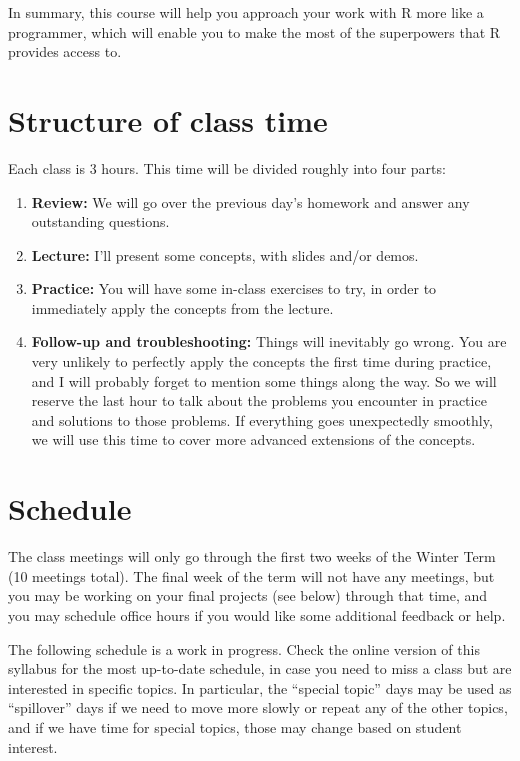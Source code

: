 \documentclass{tufte-handout}
\begin{document}
In summary, this course will help you approach your work with R more like a programmer, which will enable you to make the most of the superpowers that R provides access to.
\section*{Structure of class time}
\label{sec-4}

Each class is 3 hours.  This time will be divided roughly into four parts:
\begin{enumerate}
\item \textbf{Review:} We will go over the previous day's homework and answer any outstanding questions.
\item \textbf{Lecture:} I'll present some concepts, with slides and/or demos.
\item \textbf{Practice:} You will have some in-class exercises to try, in order to immediately apply the concepts from the lecture.
\item \textbf{Follow-up and troubleshooting:} Things will inevitably go wrong. You are very unlikely to perfectly apply the concepts the first time during practice, and I will probably forget to mention some things along the way. So we will reserve the last hour to talk about the problems you encounter in practice and solutions to those problems.  If everything goes unexpectedly smoothly, we will use this time to cover more advanced extensions of the concepts.
\end{enumerate}
\section*{Schedule}
\label{sec-5}

The class meetings will only go through the first two weeks of the Winter Term (10 meetings total). The final week of the term will not have any meetings, but you may be working on your final projects (see below) through that time, and you may schedule office hours if you would like some additional feedback or help.

The following schedule is a work in progress.  Check the online version of this syllabus for the most up-to-date schedule, in case you need to miss a class but are interested in specific topics. In particular, the ``special topic'' days may be used as ``spillover'' days if we need to move more slowly or repeat any of the other topics, and if we have time for special topics, those may change based on student interest.
\end{document}
